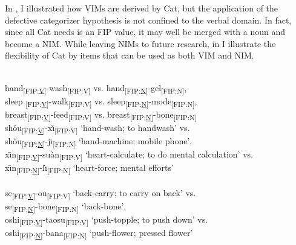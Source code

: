 \documentclass[output=paper]{langsci/langscibook}
\begin{document}
In , I illustrated how \glspl{VIM} are derived by Cat, but the
application of the defective categorizer hypothesis is not confined to the
verbal domain. In fact, since all Cat\textsubscript{\textsurd} needs is an
\gls{FIP} value, it may well be merged with a noun and become a \gls{NIM}.
While leaving \glspl{NIM} to future research, in  I illustrate the
flexibility of Cat by items that can be used as both \gls{VIM} and NIM.

\ea\label{ex:nim}
\\
hand{\textsubscript{[FIP:\underline{V}]}}-wash{\textsubscript{[FIP:V]} vs.} hand{\textsubscript{[FIP:\underline{N}]}}-gel{\textsubscript{[FIP:N]},}\\
sleep {\textsubscript{[FIP:\underline{V}]}}-walk{\textsubscript{[FIP:V]} vs.} sleep{\textsubscript{[FIP:\underline{N}]}}-mode{\textsubscript{[FIP:N]},}\\
breast{\textsubscript{[FIP:\underline{V}]}}-feed{\textsubscript{[FIP:V]} vs.} breast{\textsubscript{[FIP:\underline{N}]}}-bone{\textsubscript{[FIP:N]}%
}
\\
sh\v{o}u{\textsubscript{[FIP:\underline{V}]}}-x\v{\i}{\textsubscript{[FIP:V]} `hand-wash; to handwash'} {vs.}\\
sh\v{o}u{\textsubscript{[FIP:\underline{N}]}}-j\={\i}{\textsubscript{[FIP:N]} `hand-machine; mobile phone',}\\
x\={\i}n{\textsubscript{[FIP:\underline{V}]}}-su\`{a}n{\textsubscript{[FIP:V]} `heart-calculate; to do mental calculation'} {vs.}\\
x\={\i}n{\textsubscript{[FIP:\underline{N}]}}-l\`{\i}{\textsubscript{[FIP:N]} `heart-force; mental efforts'}\\
\\
se{\textsubscript{[FIP:\underline{V}]}}-ou{\textsubscript{[FIP:V]} `back-carry; to carry on back'} {vs.}\\
se{\textsubscript{[FIP:\underline{N}]}}-bone{\textsubscript{[FIP:N]}} {`back-bone',}\\
oshi{\textsubscript{[FIP:\underline{V}]}}-taosu{\textsubscript{[FIP:V]} `push-topple; to push down'} {vs.}\\
oshi{\textsubscript{[FIP:\underline{N}]}}-bana{\textsubscript{[FIP:N]}} {`push-flower; pressed flower'}\\
\z
\z
\end{document}
